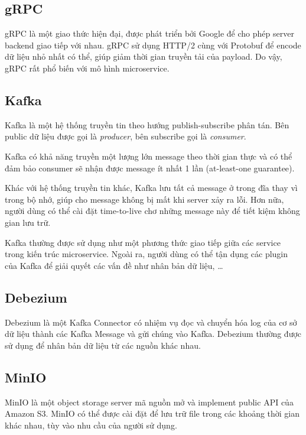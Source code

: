 \documentclass[./../main.tex]{subfiles}
\begin{document}
\hypertarget{grpc}{%
\subsection{gRPC}\label{grpc}}

gRPC là một giao thức hiện đại, được phát triển bởi Google để cho phép
server backend giao tiếp với nhau. gRPC sử dụng HTTP/2 cùng với Protobuf
để encode dữ liệu nhỏ nhất có thể, giúp giảm thời gian truyền tải của
payload. Do vậy, gRPC rất phổ biến với mô hình microservice.

\hypertarget{kafka}{%
\subsection{Kafka}\label{kafka}}

Kafka là một hệ thống truyền tin theo hướng publish-subscribe phân tán.
Bên public dữ liệu được gọi là \emph{producer}, bên subscribe gọi là
\emph{consumer}.

Kafka có khả năng truyền một lượng lớn message theo thời gian thực và có
thể đảm bảo consumer sẽ nhận được message ít nhất 1 lần (at-least-one
guarantee).

Khác với hệ thống truyền tin khác, Kafka lưu tất cả message ở trong đĩa
thay vì trong bộ nhớ, giúp cho message không bị mất khi server xảy ra
lỗi. Hơn nữa, người dùng có thể cài đặt time-to-live chơ những message
này để tiết kiệm không gian lưu trữ.

Kafka thường được sử dụng như một phương thức giao tiếp giữa các service
trong kiến trúc microservice. Ngoài ra, người dùng có thể tận dụng các
plugin của Kafka để giải quyết các vấn đề như nhân bản dữ liệu, \ldots{}

\hypertarget{debezium}{%
\subsection{Debezium}\label{debezium}}

Debezium là một Kafka Connector có nhiệm vụ đọc và chuyển hóa log của cơ
sở dữ liệu thành các Kafka Message và gửi chúng vào Kafka. Debezium
thường được sử dụng để nhân bản dữ liệu từ các nguồn khác nhau.

\hypertarget{minio}{%
\subsection{MinIO}\label{minio}}

MinIO là một object storage server mã nguồn mở và implement public API
của Amazon S3. MinIO có thể được cài đặt để lưu trữ file trong các
khoảng thời gian khác nhau, tùy vào nhu cầu của người sử dụng.
\end{document}
